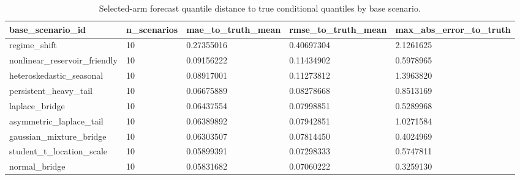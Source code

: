 \begin{table}[t]
\centering
\small
\begin{tabular}{@{}lllll@{}}
\toprule
base\_scenario\_id & n\_scenarios & mae\_to\_truth\_mean & rmse\_to\_truth\_mean & max\_abs\_error\_to\_truth
\\
\midrule
regime\_shift & 10 & 0.27355016 & 0.40697304 & 2.1261625 \\
nonlinear\_reservoir\_friendly & 10 & 0.09156222 & 0.11434902 & 0.5978965 \\
heteroskedastic\_seasonal & 10 & 0.08917001 & 0.11273812 & 1.3963820 \\
persistent\_heavy\_tail & 10 & 0.06675889 & 0.08278668 & 0.8513169 \\
laplace\_bridge & 10 & 0.06437554 & 0.07998851 & 0.5289968 \\
asymmetric\_laplace\_tail & 10 & 0.06389892 & 0.07942851 & 1.0271584 \\
gaussian\_mixture\_bridge & 10 & 0.06303507 & 0.07814450 & 0.4024969 \\
student\_t\_location\_scale & 10 & 0.05899391 & 0.07298333 & 0.5747811 \\
normal\_bridge & 10 & 0.05831682 & 0.07060222 & 0.3259130 \\
\bottomrule
\end{tabular}
\caption{Selected-arm forecast quantile distance to true conditional quantiles by base scenario.}
\label{tab:joint-qvp-phase4k-scenario-summary}
\end{table}
